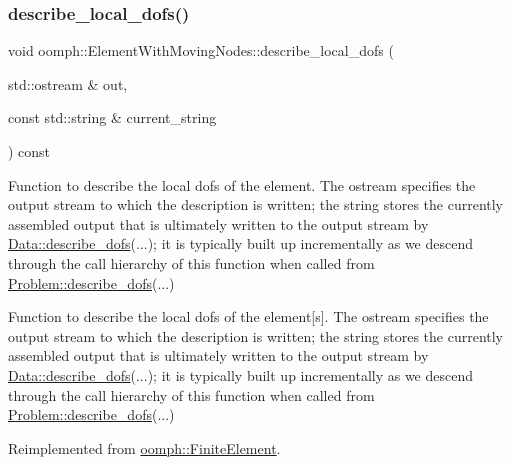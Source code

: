 \subsubsection{\texorpdfstring{describe\+\_\+local\+\_\+dofs()}{describe\_local\_dofs()}}
{\footnotesize\ttfamily void oomph\+::\+Element\+With\+Moving\+Nodes\+::describe\+\_\+local\+\_\+dofs (\begin{DoxyParamCaption}\item[{std\+::ostream \&}]{out,  }\item[{const std\+::string \&}]{current\+\_\+string }\end{DoxyParamCaption}) const\hspace{0.3cm}{\ttfamily [virtual]}}



Function to describe the local dofs of the element. The ostream specifies the output stream to which the description is written; the string stores the currently assembled output that is ultimately written to the output stream by \hyperlink{classoomph_1_1Data_a2dae16e2dcff9a40029f834c83364df5}{Data\+::describe\+\_\+dofs}(...); it is typically built up incrementally as we descend through the call hierarchy of this function when called from \hyperlink{classoomph_1_1Problem_abc103804eb319ae0b3d43870cc3e1eaf}{Problem\+::describe\+\_\+dofs}(...) 

Function to describe the local dofs of the element\mbox{[}s\mbox{]}. The ostream specifies the output stream to which the description is written; the string stores the currently assembled output that is ultimately written to the output stream by \hyperlink{classoomph_1_1Data_a2dae16e2dcff9a40029f834c83364df5}{Data\+::describe\+\_\+dofs}(...); it is typically built up incrementally as we descend through the call hierarchy of this function when called from \hyperlink{classoomph_1_1Problem_abc103804eb319ae0b3d43870cc3e1eaf}{Problem\+::describe\+\_\+dofs}(...) 

Reimplemented from \hyperlink{classoomph_1_1FiniteElement_aad9f9ebb2996fd9c44caf34da8bc7941}{oomph\+::\+Finite\+Element}.



